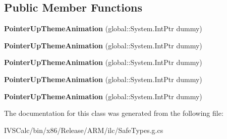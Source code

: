 \subsection*{Public Member Functions}
\begin{DoxyCompactItemize}
\item 
\mbox{\label{class_windows_1_1_u_i_1_1_xaml_1_1_media_1_1_animation_1_1_pointer_up_theme_animation_a744a39e5751b691a69c76d651832bf55}} 
{\bfseries Pointer\+Up\+Theme\+Animation} (global\+::\+System.\+Int\+Ptr dummy)
\item 
\mbox{\label{class_windows_1_1_u_i_1_1_xaml_1_1_media_1_1_animation_1_1_pointer_up_theme_animation_a744a39e5751b691a69c76d651832bf55}} 
{\bfseries Pointer\+Up\+Theme\+Animation} (global\+::\+System.\+Int\+Ptr dummy)
\item 
\mbox{\label{class_windows_1_1_u_i_1_1_xaml_1_1_media_1_1_animation_1_1_pointer_up_theme_animation_a744a39e5751b691a69c76d651832bf55}} 
{\bfseries Pointer\+Up\+Theme\+Animation} (global\+::\+System.\+Int\+Ptr dummy)
\item 
\mbox{\label{class_windows_1_1_u_i_1_1_xaml_1_1_media_1_1_animation_1_1_pointer_up_theme_animation_a744a39e5751b691a69c76d651832bf55}} 
{\bfseries Pointer\+Up\+Theme\+Animation} (global\+::\+System.\+Int\+Ptr dummy)
\item 
\mbox{\label{class_windows_1_1_u_i_1_1_xaml_1_1_media_1_1_animation_1_1_pointer_up_theme_animation_a744a39e5751b691a69c76d651832bf55}} 
{\bfseries Pointer\+Up\+Theme\+Animation} (global\+::\+System.\+Int\+Ptr dummy)
\end{DoxyCompactItemize}


The documentation for this class was generated from the following file\+:\begin{DoxyCompactItemize}
\item 
I\+V\+S\+Calc/bin/x86/\+Release/\+A\+R\+M/ilc/Safe\+Types.\+g.\+cs\end{DoxyCompactItemize}
